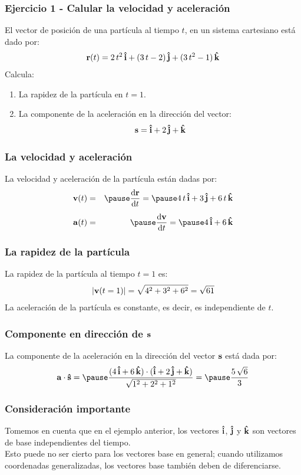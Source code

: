 \documentclass[12pt]{beamer}
\begin{document}
\begin{frame}
\frametitle{Ejercicio 1 - Calular la velocidad y aceleración}
El vector de posición de una partícula al tiempo $t$, en un sistema cartesiano está dado por:
\begin{align*}
\vb{r}(t) = 2 \, t^{2} \, \vu{i} +  (3 \, t - 2) \, \vu{j} + (3 \, t^{2} - 1) \, \vu{k}
\end{align*}
\pause
Calcula:
\begin{enumerate}
\item La rapidez de la partícula en $t = 1$.
\item La componente de la aceleración en la dirección del vector:
\begin{align*}
\vb{s} = \vu{i} + 2 \, \vu{j} + \vu{k}
\end{align*}
\end{enumerate}
\end{frame}
\begin{frame}
\frametitle{La velocidad y aceleración}
La velocidad y aceleración de la partícula están dadas por:
\begin{eqnarray*}
\vb{v} (t) &=& \pause \dv{\vb{r}}{t} = \pause 4 \, t \, \vu{i} + 3 \, \vu{j} + 6 \, t \, \vu{k} \\[0.5em]
\vb{a} (t) &=& \pause \dv{\vb{v}}{t} = \pause 4 \, \vu{i} + 6 \, \vu{k}
\end{eqnarray*}
\end{frame}
\begin{frame}
\frametitle{La rapidez de la partícula}
La rapidez de la partícula al tiempo $t = 1$ es:
\begin{align*}
\abs{\vb{v}(t = 1)} = \sqrt{4^{2} + 3^{2} + 6^{2}} = \sqrt{61}
\end{align*}
\pause
La aceleración de la partícula es constante, es decir, es independiente de $t$.
\end{frame}
\begin{frame}
\frametitle{Componente en dirección de $\vb{s}$}
La componente de la aceleración en la dirección del vector $\vb{s}$ está dada por:
\begin{eqnarray*}
\vb{a} \cdot \vu{s} = \pause \dfrac{(4 \, \vu{i} + 6 \, \vu{k}) \cdot (\vu{i} + 2 \, \vu{j} + \vu{k})}{\sqrt{1^{2} + 2^{2} + 1^{2}}} = \pause \dfrac{5 \, \sqrt{6}}{3}
\end{eqnarray*}
\end{frame}
\begin{frame}
\frametitle{Consideración importante}
Tomemos en cuenta que en el ejemplo anterior, los vectores $\vu{i}$, $\vu{j}$ y $\vu{k}$ son vectores de base independientes del tiempo.
\\
\bigskip
\pause
Esto puede no ser cierto para los vectores base en general; cuando utilizamos coordenadas generalizadas, los vectores base también deben de diferenciarse.
\end{frame}
\end{document}
